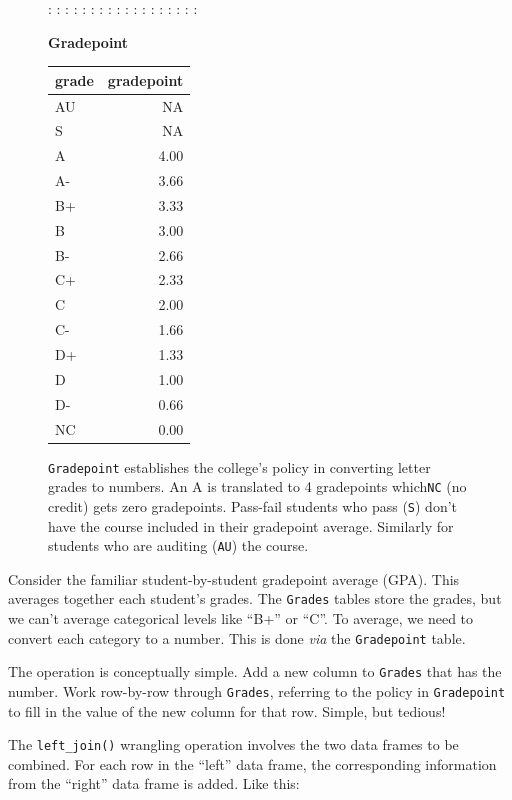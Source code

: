 \documentclass[
  letterpaper,
  DIV=11,
  numbers=noendperiod,
  oneside]{scrartcl}
\begin{document}
\begin{figure}
: : : : : : : : : : : : : : : : : :

\textbf{Gradepoint}

\begin{tabular}{l|r}
\hline
grade & gradepoint\\
\hline
AU & NA\\
\hline
S & NA\\
\hline
A & 4.00\\
\hline
A- & 3.66\\
\hline
B+ & 3.33\\
\hline
B & 3.00\\
\hline
B- & 2.66\\
\hline
C+ & 2.33\\
\hline
C & 2.00\\
\hline
C- & 1.66\\
\hline
D+ & 1.33\\
\hline
D & 1.00\\
\hline
D- & 0.66\\
\hline
NC & 0.00\\
\hline
\end{tabular}

\texttt{Gradepoint} establishes the college's policy in converting
letter grades to numbers. An A is translated to 4 gradepoints
which\texttt{NC} (no credit) gets zero gradepoints. Pass-fail students
who pass (\texttt{S}) don't have the course included in their gradepoint
average. Similarly for students who are auditing (\texttt{AU}) the
course.

\end{figure}%

Consider the familiar student-by-student gradepoint average (GPA). This
averages together each student's grades. The \texttt{Grades} tables
store the grades, but we can't average categorical levels like ``B+'' or
``C''. To average, we need to convert each category to a number. This is
done \emph{via} the \texttt{Gradepoint} table.

The operation is conceptually simple. Add a new column to
\texttt{Grades} that has the number. Work row-by-row through
\texttt{Grades}, referring to the policy in \texttt{Gradepoint} to fill
in the value of the new column for that row. Simple, but tedious!

The \texttt{left\_join()} wrangling operation involves the two data
frames to be combined. For each row in the ``left'' data frame, the
corresponding information from the ``right'' data frame is added. Like
this:

{}
\end{document}
